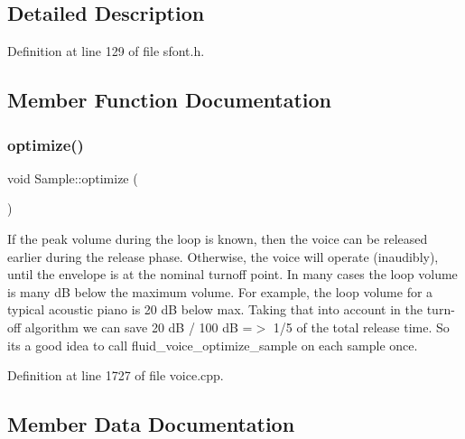 \subsection{Detailed Description}


Definition at line 129 of file sfont.\+h.



\subsection{Member Function Documentation}
\mbox{\label{class_fluid_s_1_1_sample_ab8ad9753f3b65002d59291872e5bd774}} 
\subsubsection{\texorpdfstring{optimize()}{optimize()}}
{\footnotesize\ttfamily void Sample\+::optimize (\begin{DoxyParamCaption}{ }\end{DoxyParamCaption})}

If the peak volume during the loop is known, then the voice can be released earlier during the release phase. Otherwise, the voice will operate (inaudibly), until the envelope is at the nominal turnoff point. In many cases the loop volume is many dB below the maximum volume. For example, the loop volume for a typical acoustic piano is 20 dB below max. Taking that into account in the turn-\/off algorithm we can save 20 dB / 100 dB =$>$ 1/5 of the total release time. So it\textquotesingle{}s a good idea to call fluid\+\_\+voice\+\_\+optimize\+\_\+sample on each sample once. 

Definition at line 1727 of file voice.\+cpp.



\subsection{Member Data Documentation}
\mbox{\label{class_fluid_s_1_1_sample_a0bcea34e0cf4f09a5c522b09da7cffc0}} 
